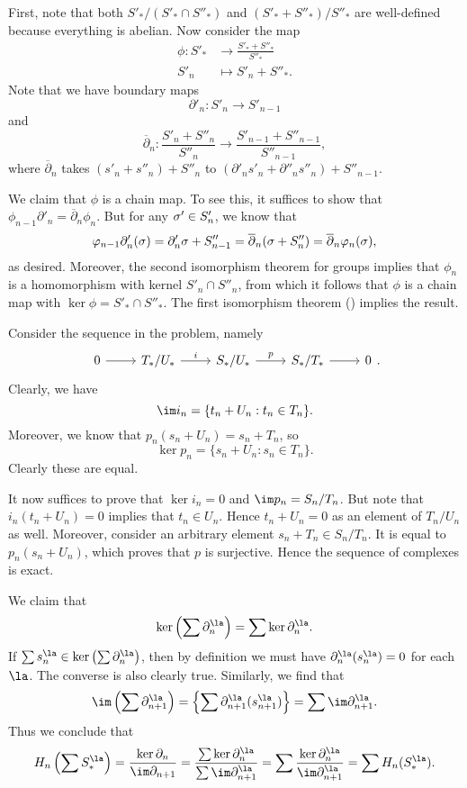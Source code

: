 \documentclass[../../solutions.tex]{subfiles}
\begin{document}
\begin{exercise} \leavevmode
First, note that both $S'_*/(S'_*\cap S''_*)$ and $(S'_*+S''_*)/S''_*$ are well-defined because everything is abelian. 
Now consider the map \begin{align*}\phi:S'_*&\to\frac{S'_*+S''_*}{S''_*}\\S'_n&\mapsto S'_n+S''_*.\end{align*}
Note that we have boundary maps \[\partial'_n:S'_n\to S'_{n-1}\] and \[\overline\partial_n:\frac{S'_n+S''_n}{S''_n}\to\frac{S'_{n-1}+S''_{n-1}}{S''_{n-1}},\] where $\overline\partial_n$ takes $(s'_n+s''_n)+S''_n$ to $(\partial'_ns'_n+\partial''_ns''_n)+S''_{n-1}$. 

We claim that $\phi$ is a chain map.
To see this, it suffices to show that $\phi_{n-1}\partial'_n=\overline\partial_n\phi_n$. But for any $\sigma'\in S'_n$, we know that \[\varphi_{n-1}\partial'_n(\sigma)=\partial'_n\sigma+S''_{n-1}=\overline\partial_n(\sigma+S''_n)=\overline\partial_n\varphi_n(\sigma),\] as desired. 
Moreover, the second isomorphism theorem for groups implies that $\phi_n$ is a homomorphism with kernel $S'_n\cap S''_n$, from which it follows that $\phi$ is a chain map with $\ker\phi=S'_*\cap S''_*$. The first isomorphism theorem () implies the result. 
\end{exercise}

\begin{exercise} \leavevmode
Consider the sequence in the problem, namely 
\[\begin{tikzcd}0\ar[r]&T_*/U_*\ar[r,"i"]&S_*/U_*\ar[r,"p"]&S_*/T_*\ar[r]&0\end{tikzcd}.\]
Clearly, we have \[\im i_n=\{t_n+U_n:t_n\in T_n\}.\] 
Moreover, we know that $p_n(s_n+U_n)=s_n+T_n$, so \[\ker p_n=\{s_n+U_n:s_n\in T_n\}.\] Clearly these are equal. 

It now suffices to prove that $\ker i_n=0$ and $\im p_n=S_n/T_n$. 
But note that $i_n(t_n+U_n)=0$ implies that $t_n\in U_n$. 
Hence $t_n+U_n=0$ as an element of $T_n/U_n$ as well. 
Moreover, consider an arbitrary element $s_n+T_n\in S_n/T_n$. 
It is equal to $p_n(s_n+U_n)$, which proves that $p$ is surjective. 
Hence the sequence of complexes is exact. 
\end{exercise}

\begin{exercise} \leavevmode
We claim that \[\ker\left(\sum\partial_n^\la\right)=\sum\ker\partial_n^\la.\]
If $\sum s_n^\la\in\ker\left(\sum\partial_n^\la\right)$, then by definition we must have $\partial_n^\la(s_n^\la)=0$ for each $\la$. 
The converse is also clearly true. 
Similarly, we find that \[\im\left(\sum\partial_{n+1}^\la\right)=\left\{\sum\partial_{n+1}^\la(s_{n+1}^\la)\right\}=\sum\im\partial_{n+1}^\la.\]
Thus we conclude that \[H_n\left(\sum S_*^\la\right)=\frac{\ker\partial_n}{\im\partial_{n+1}}=\frac{\sum\ker\partial_n^\la}{\sum\im\partial_{n+1}^\la}=\sum\frac{\ker\partial_n^\la}{\im\partial_{n+1}^\la}=\sum H_n(S_*^\la).\]
\end{exercise}
\end{document}
